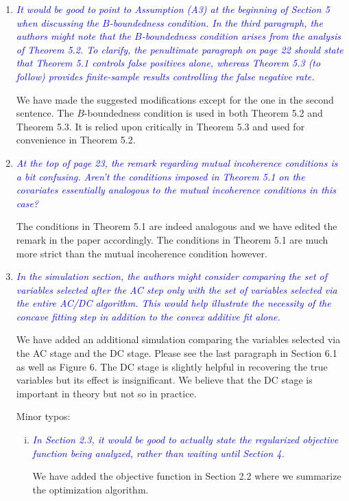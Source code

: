 \documentclass[pdftex,12pt]{article}
\def\rc#1{{\it\textcolor{blue}{#1}}\smallskip}
\begin{document}
\begin{enumerate}[(1)]
\item \rc{It would be good to point to Assumption (A3) at the beginning of
Section 5 when discussing the $B$-boundedness condition. In the third
paragraph, the authors might note that the $B$-boundedness condition
arises from the analysis of Theorem 5.2. To clarify, the penultimate
paragraph on page 22 should state that Theorem 5.1 controls false
positives alone, whereas Theorem 5.3 (to follow) provides
finite-sample results controlling the false negative rate.}

We have made the suggested modifications except for the one in the second sentence. The $B$-boundedness condition is used in both Theorem 5.2 and Theorem 5.3. It is relied upon critically in Theorem 5.3 and used for convenience in Theorem 5.2. 


\item \rc{At the top
of page 23, the remark regarding mutual incoherence conditions is a
bit confusing. Aren’t the conditions imposed in Theorem 5.1 on the
covariates essentially analogous to the mutual incoherence conditions
in this case? }

The conditions in Theorem 5.1 are indeed analogous and we have edited the remark in the paper accordingly. The conditions in Theorem 5.1 are much more strict than the mutual incoherence condition however. 

\item \rc{In the simulation section, the authors might consider comparing the
set of variables selected after the AC step only with the set of
variables selected via the entire AC/DC algorithm. This would help
illustrate the necessity of the concave fitting step in addition to
the convex additive fit alone.}

We have added an additional simulation comparing the variables selected via the AC stage and the DC stage. Please see the last paragraph in Section 6.1 as well as Figure 6. The DC stage is slightly helpful in recovering the true variables but its effect is insignificant. We believe that the DC stage is important in theory but not so in practice. 

Minor typos:
\begin{enumerate}[(i)]
\item \rc{In Section 2.3, it would be good to actually state the regularized
objective function being analyzed, rather than waiting until Section
4.}

We have added the objective function in Section 2.2 where we summarize the optimization algorithm.


\end{enumerate}
\end{enumerate}
\end{document}
